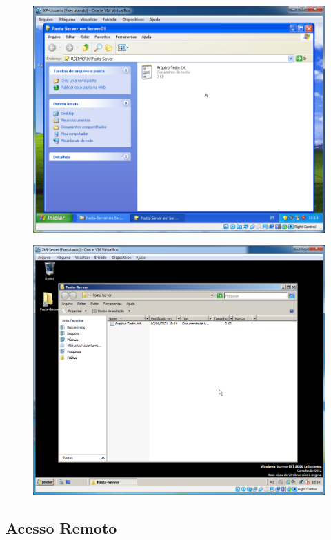\documentclass[10pt]{article}
\begin{document}
\begin{figure}[H]
    \centering
    \caption{}
    \label{fig:5126}
    \includegraphics[width=\linewidth]{images/windows_server/compartilhamento/026.png}
\end{figure}
\begin{figure}[H]
    \centering
    \caption{}
    \label{fig:5127}
    \includegraphics[width=\linewidth]{images/windows_server/compartilhamento/027.png}
\end{figure}

\subsection{Acesso Remoto}
\end{document}
